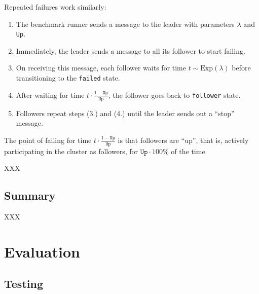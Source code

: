 \documentclass[draft,11pt,chapterprefix=true,toc=bibliography,numbers=noendperiod,
               footnotes=multiple,twoside]{scrreprt}
\begin{document}
Repeated failures work similarly:

\begin{enumerate}
    \item The benchmark runner sends a message to the leader with parameters \(\lambda\) and \texttt{Up}.
    \item Immediately, the leader sends a message to all its follower to start failing.
    \item On receiving this message, each follower waits for time \(t \sim \text{Exp}(\lambda)\) before transitioning to the \texttt{failed} state.
    \item After waiting for time \(t \cdot \frac{1 - \texttt{Up}}{\texttt{Up}}\), the follower goes back to \texttt{follower} state.
    \item Followers repeat steps (3.) and (4.) until the leader sends out a \enquote{stop} message.
\end{enumerate}

The point of failing for time \(t \cdot \frac{1 - \texttt{Up}}{\texttt{Up}}\) is that followers are \enquote{up}, that is, actively participating in the cluster as followers, for \(\texttt{Up} \cdot 100\%\) of the time.

XXX

\section{Summary}

XXX

\chapter{Evaluation\label{ch:evaluation}}



\section{Testing}
\end{document}
